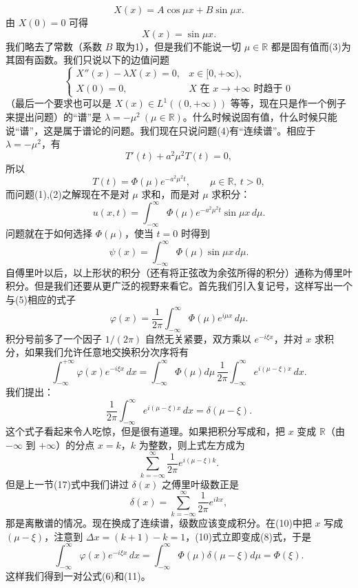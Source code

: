 \[
 X(x)=A\cos\mu x+B\sin\mu x.
\]
由 $X(0)=0$ 可得
\begin{equation}
 X(x)=\sin\mu x.
 \tag{3}
\end{equation}
我们略去了常数（系数 $B$ 取为1），但是我们不能说一切 $\mu\in\mathbb R$ 都是固有值而(3)为其固有函数。我们只说以下的边值问题
\begin{equation}
 \begin{cases}
 X''(x)-\lambda X(x)=0,&x\in[0,+\infty),\\
 X(0)=0,&X\text{ 在 }x\to+\infty\text{ 时趋于 }0
 \end{cases}
 \tag{4}
\end{equation}
（最后一个要求也可以是 $X(x)\in L^1((0,+\infty))$ 等等，现在只是作一个例子来提出问题）的“谱”是 $\lambda=-\mu^2\ (\mu\in\mathbb R)$。什么时候说固有值，什么时候只能说“谱”，这是属于谱论的问题。我们现在只说问题(4)有“连续谱”。相应于 $\lambda=-\mu^2$，有
\[
 T'(t)+a^2\mu^2T(t)=0,
\]
所以
\[
 T(t)=\Phi(\mu)e^{-a^2\mu^2t},\qquad \mu\in\mathbb R,\ t>0,
\]
而问题(1),(2)之解现在不是对 $\mu$ 求和，而是对 $\mu$ 求积分：
\[
 u(x,t)=\int_{-\infty}^{\infty}\Phi(\mu)e^{-a^2\mu^2t}\sin\mu x\,d\mu.
\]
问题就在于如何选择 $\Phi(\mu)$，使当 $t=0$ 时得到
\begin{equation}
 \psi(x)=\int_{-\infty}^{\infty}\Phi(\mu)\sin\mu x\,d\mu.
 \tag{5}
\end{equation}
自傅里叶以后，以上形状的积分（还有将正弦改为余弦所得的积分）通称为傅里叶积分。但是我们还要从更广泛的视野来看它。首先我们引入复记号，这样写出一个与(5)相应的式子
\begin{equation}
 \varphi(x)=\frac1{2\pi}\int_{-\infty}^{\infty}\Phi(\mu)e^{i\mu x}\,d\mu.
 \tag{6}
\end{equation}
积分号前多了一个因子 $1/(2\pi)$ 自然无关紧要，双方乘以 $e^{-i\xi x}$，并对 $x$ 求积分，如果我们允许任意地交换积分次序将有
\begin{equation}
 \int_{-\infty}^{+\infty}\varphi(x)e^{-i\xi x}\,dx
 =\int_{-\infty}^{\infty}\Phi(\mu)d\mu\,\frac1{2\pi}\int_{-\infty}^{\infty}e^{i(\mu-\xi)x}\,dx.
 \tag{7}
\end{equation}
我们提出：
\begin{equation}
 \frac1{2\pi}\int_{-\infty}^{\infty}e^{i(\mu-\xi)x}\,dx=\delta(\mu-\xi).
 \tag{8}
\end{equation}
这个式子看起来令人吃惊，但是很有道理。如果把积分写成和，把 $x$ 变成 $\mathbb R$（由 $-\infty$ 到 $+\infty$）的分点 $x=k$，$k$ 为整数，则上式左方成为
\begin{equation}
 \sum_{k=-\infty}^{\infty}\frac1{2\pi}e^{i(\mu-\xi)k}.
 \tag{9}
\end{equation}
但是上一节(17)式中我们讲过 $\delta(x)$ 之傅里叶级数正是
\begin{equation}
 \delta(x)=\sum_{k=-\infty}^{\infty}\frac1{2\pi}e^{ikx},
 \tag{10}
\end{equation}
那是离散谱的情况。现在换成了连续谱，级数应该变成积分。在(10)中把 $x$ 写成 $(\mu-\xi)$，注意到 $\Delta x=(k+1)-k=1$，(10)式立即变成(8)式，于是
\begin{equation}
 \int_{-\infty}^{\infty}\varphi(x)e^{-i\xi x}\,dx
 =\int_{-\infty}^{\infty}\Phi(\mu)\delta(\mu-\xi)d\mu
 =\Phi(\xi).
 \tag{11}
\end{equation}
这样我们得到一对公式(6)和(11)。

